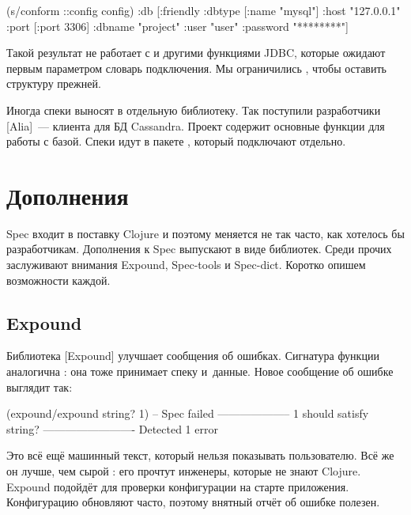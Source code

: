 \begin{clojure/lines}
(s/conform ::config config)
{:db
 [:friendly
  {:dbtype   [:name "mysql"]
   :host     "127.0.0.1"
   :port     [:port 3306]
   :dbname   "project"
   :user     "user"
   :password "********"}]}
\end{clojure/lines}

Такой результат не работает с  и другими функциями JDBC, которые
ожидают первым параметром словарь подключения. Мы ограничились ,
чтобы оставить структуру прежней.

Иногда спеки выносят в отдельную библиотеку. Так поступили разработчики
[Alia]~--- клиента для БД
Cassandra. Проект  содержит основные функции для работы с
базой. Спеки идут в пакете , который подключают
отдельно.

\section{Дополнения}

Spec входит в поставку Clojure и поэтому меняется не так часто, как хотелось бы
разработчикам. Дополнения к Spec выпускают в виде библиотек. Среди прочих
заслуживают внимания Expound, Spec-tools и Spec-dict. Коротко опишем возможности каждой.

\subsection{Expound}

\label{expound}

Библиотека [Expound] улучшает сообщения об
ошибках. Сигнатура функции  аналогична : она
тоже принимает спеку и~данные. Новое сообщение об ошибке выглядит так:


\begin{clojure}
(expound/expound string? 1)
-- Spec failed --------------------
  1
should satisfy
  string?
-------------------------
Detected 1 error
\end{clojure}


Это всё ещё машинный текст, который нельзя показывать пользователю. Всё же он
лучше, чем сырой : его прочтут инженеры, которые не знают
Clojure. Expound подойдёт для проверки конфигурации на старте
приложения. Конфигурацию обновляют часто, поэтому внятный отчёт об ошибке
полезен.

